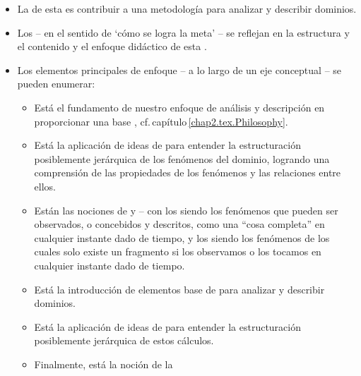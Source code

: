 \vspace*{-4mm}

\begin{itemize}
\item La  de esta \monograph es contribuir a una 
      metodología para analizar y describir dominios.
  
\item Los  -- en el sentido de `cómo se logra la meta' -- se reflejan en la estructura y el contenido
      y el enfoque didáctico de esta \monograph.
\item Los elementos principales de  enfoque -- a lo largo de un
  eje conceptual -- se pueden enumerar: 
\begin{itemize}
\item Está el fundamento de nuestro enfoque de análisis y descripción
      en proporcionar una base ,
      cf.\,capítulo\,\ref{chap2.tex.Philosophy}. 
\item Está la aplicación de ideas de  
      para entender la estructuración posiblemente jerárquica
      de los fenómenos del dominio, logrando una comprensión de las propiedades
      de los fenómenos y las relaciones entre ellos.
\item Están las nociones de  y  -- %
      con los    siendo los fenómenos
\begynd
\pind que pueden ser observados, o concebidos y descritos, como \nyl una ``cosa completa'' en cualquier instante dado de tiempo,
\afslut
      y los    siendo los fenómenos 
\begynd
\pind de los cuales solo existe un fragmento\pos{}{\\} si los observamos o
      los tocamos\pos{}{\\} en cualquier instante dado de tiempo.
\afslut
\item Está la introducción de elementos base de
         para analizar y
      describir dominios. 
\item Está la aplicación de ideas de  
      para entender la estructuración posiblemente jerárquica
      de estos cálculos. 
\item Finalmente, está la noción de la

\end{itemize}
\end{itemize}
